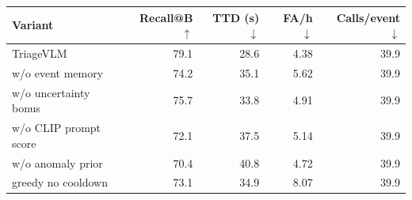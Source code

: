 \begin{tabular}{lrrrr}
\toprule
Variant & Recall@B $\uparrow$ & TTD (s) $\downarrow$ & FA/h $\downarrow$ & Calls/event $\downarrow$ \\
\midrule
TriageVLM & 79.1 & 28.6 & 4.38 & 39.9 \\
w/o event memory & 74.2 & 35.1 & 5.62 & 39.9 \\
w/o uncertainty bonus & 75.7 & 33.8 & 4.91 & 39.9 \\
w/o CLIP prompt score & 72.1 & 37.5 & 5.14 & 39.9 \\
w/o anomaly prior & 70.4 & 40.8 & 4.72 & 39.9 \\
greedy no cooldown & 73.1 & 34.9 & 8.07 & 39.9 \\
\bottomrule
\end{tabular}
